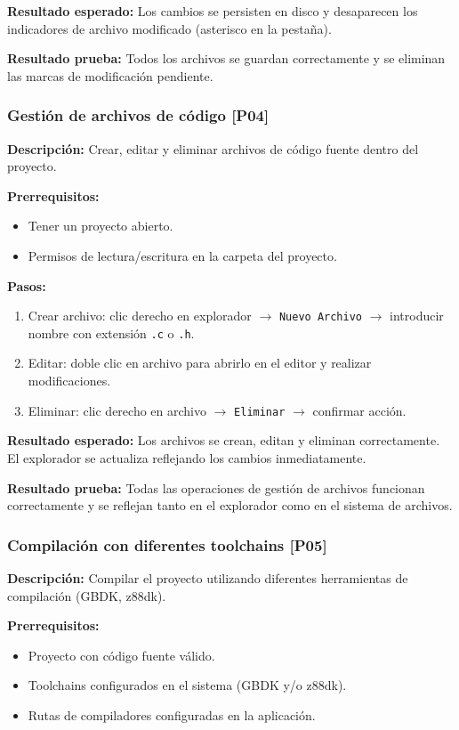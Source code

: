 \documentclass[../../main.tex]{subfiles}
\begin{document}
\textbf{Resultado esperado:} Los cambios se persisten en disco y desaparecen los indicadores de archivo modificado (asterisco en la pestaña).

\textbf{Resultado prueba:} Todos los archivos se guardan correctamente y se eliminan las marcas de modificación pendiente.

\subsubsection{Gestión de archivos de código [P04]}

\textbf{Descripción:} Crear, editar y eliminar archivos de código fuente dentro del proyecto.

\textbf{Prerrequisitos:} 
\begin{itemize}
\item Tener un proyecto abierto.
\item Permisos de lectura/escritura en la carpeta del proyecto.
\end{itemize}

\textbf{Pasos:}
\begin{enumerate}
\item Crear archivo: clic derecho en explorador $\rightarrow$ \lstinline|Nuevo Archivo| $\rightarrow$ introducir nombre con extensión \lstinline|.c| o \lstinline|.h|.
\item Editar: doble clic en archivo para abrirlo en el editor y realizar modificaciones.
\item Eliminar: clic derecho en archivo $\rightarrow$ \lstinline|Eliminar| $\rightarrow$ confirmar acción.
\end{enumerate}

\textbf{Resultado esperado:} Los archivos se crean, editan y eliminan correctamente. El explorador se actualiza reflejando los cambios inmediatamente.

\textbf{Resultado prueba:} Todas las operaciones de gestión de archivos funcionan correctamente y se reflejan tanto en el explorador como en el sistema de archivos.

\subsubsection{Compilación con diferentes toolchains [P05]}

\textbf{Descripción:} Compilar el proyecto utilizando diferentes herramientas de compilación (GBDK, z88dk).

\textbf{Prerrequisitos:} 
\begin{itemize}
\item Proyecto con código fuente válido.
\item Toolchains configurados en el sistema (GBDK y/o z88dk).
\item Rutas de compiladores configuradas en la aplicación.
\end{itemize}
 
\end{document}
